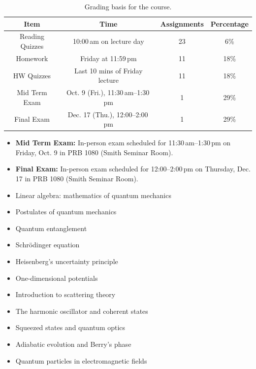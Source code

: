 \begin{table}[htbp]
\centering
\caption{Grading basis for the course.}\label{tab:grades}
\vspace{0.5em}
\begin{tabular}{cccc}
\hline
\textbf{Item} & \textbf{Time} & \textbf{Assignments} & \textbf{Percentage} \\
\hline
Reading Quizzes & 10:00\,am on lecture day & 23 & 6\% \\
Homework & Friday at 11:59\,pm & 11 & 18\% \\
HW Quizzes & Last 10 mins of Friday lecture & 11 & 18\% \\
Mid Term Exam & Oct. 9 (Fri.), 11:30\,am--1:30\,pm & 1 & 29\% \\
Final Exam & Dec. 17 (Thu.), 12:00--2:00\,pm & 1 & 29\% \\
\hline
\end{tabular}
\end{table}

\begin{itemize}
  \item \textbf{Mid Term Exam:} In-person exam scheduled for 11:30\,am--1:30\,pm on Friday, Oct. 9 in PRB 1080 (Smith Seminar Room).
  \item \textbf{Final Exam:} In-person exam scheduled for 12:00--2:00\,pm on Thursday, Dec. 17 in PRB 1080 (Smith Seminar Room).
\end{itemize}

\begin{itemize}
  \item Linear algebra: mathematics of quantum mechanics
  \item Postulates of quantum mechanics
  \item Quantum entanglement
  \item Schrödinger equation
  \item Heisenberg's uncertainty principle
  \item One-dimensional potentials
  \item Introduction to scattering theory
  \item The harmonic oscillator and coherent states
  \item Squeezed states and quantum optics
  \item Adiabatic evolution and Berry's phase
  \item Quantum particles in electromagnetic fields
\end{itemize}

